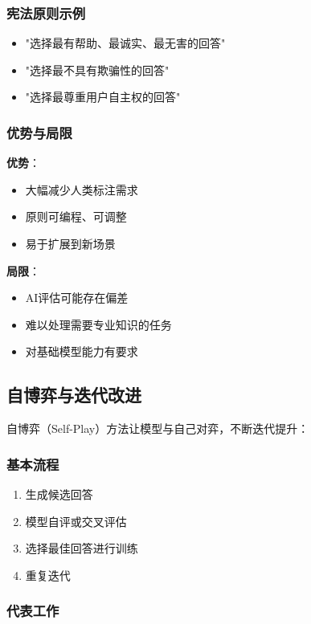 \documentclass[12pt,a4paper]{article}
\begin{document}
\subsubsection{宪法原则示例}

\begin{itemize}
    \item "选择最有帮助、最诚实、最无害的回答"
    \item "选择最不具有欺骗性的回答"
    \item "选择最尊重用户自主权的回答"
\end{itemize}

\subsubsection{优势与局限}

\textbf{优势}：
\begin{itemize}
    \item 大幅减少人类标注需求
    \item 原则可编程、可调整
    \item 易于扩展到新场景
\end{itemize}

\textbf{局限}：
\begin{itemize}
    \item AI评估可能存在偏差
    \item 难以处理需要专业知识的任务
    \item 对基础模型能力有要求
\end{itemize}

\subsection{自博弈与迭代改进}

自博弈（Self-Play）方法让模型与自己对弈，不断迭代提升：

\subsubsection{基本流程}

\begin{enumerate}
    \item 生成候选回答
    \item 模型自评或交叉评估
    \item 选择最佳回答进行训练
    \item 重复迭代
\end{enumerate}

\subsubsection{代表工作}
\end{document}
